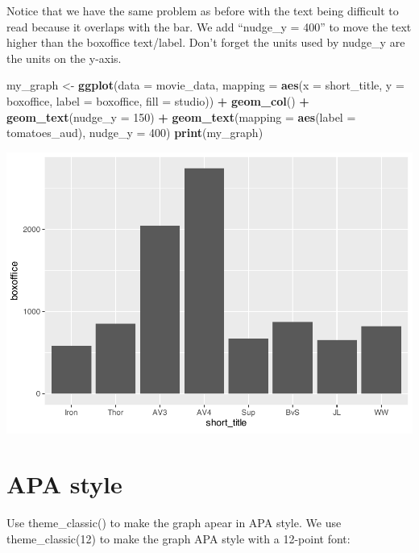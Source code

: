 \documentclass[
]{krantz}
\makeatletter
\newenvironment{Shaded}{\begin{snugshade}}{\end{snugshade}}
\newcommand{\DataTypeTok}[1]{\textcolor[rgb]{0.27,0.27,0.27}{#1}}
\newcommand{\DecValTok}[1]{\textcolor[rgb]{0.06,0.06,0.06}{#1}}
\newcommand{\KeywordTok}[1]{\textcolor[rgb]{0.27,0.27,0.27}{\textbf{#1}}}
\newcommand{\NormalTok}[1]{#1}
\newcommand{\OperatorTok}[1]{\textcolor[rgb]{0.43,0.43,0.43}{\textbf{#1}}}
\newcommand{\StringTok}[1]{\textcolor[rgb]{0.5,0.5,0.5}{#1}}
\newenvironment{kframe}{%
\medskip{}
\setlength{\fboxsep}{.8em}
 \def\at@end@of@kframe{}%
 \ifinner\ifhmode%
  \def\at@end@of@kframe{\end{minipage}}%
  \begin{minipage}{\columnwidth}%
 \fi\fi%
 \def\FrameCommand##1{\hskip\@totalleftmargin \hskip-\fboxsep
 \colorbox{shadecolor}{##1}\hskip-\fboxsep
     \hskip-\linewidth \hskip-\@totalleftmargin \hskip\columnwidth}%
 \MakeFramed {\advance\hsize-\width
   \@totalleftmargin\z@ \linewidth\hsize
   \@setminipage}}%
 {\par\unskip\endMakeFramed%
 \at@end@of@kframe}
\renewenvironment{Shaded}{\begin{kframe}}{\end{kframe}}
\makeatother
\begin{document}
Notice that we have the same problem as before with the text being difficult to read because it overlaps with the bar. We add ``nudge\_y = 400'' to move the text higher than the boxoffice text/label. Don't forget the units used by nudge\_y are the units on the y-axis.

\begin{Shaded}
\begin{Highlighting}[]
\NormalTok{my_graph <-}\StringTok{ }\KeywordTok{ggplot}\NormalTok{(}\DataTypeTok{data =}\NormalTok{ movie_data,}
           \DataTypeTok{mapping =} \KeywordTok{aes}\NormalTok{(}\DataTypeTok{x =}\NormalTok{ short_title,}
                         \DataTypeTok{y =}\NormalTok{ boxoffice,}
                         \DataTypeTok{label =}\NormalTok{ boxoffice, }
                         \DataTypeTok{fill =}\NormalTok{ studio)) }\OperatorTok{+}
\StringTok{  }\KeywordTok{geom_col}\NormalTok{() }\OperatorTok{+}
\StringTok{  }\KeywordTok{geom_text}\NormalTok{(}\DataTypeTok{nudge_y =} \DecValTok{150}\NormalTok{)  }\OperatorTok{+}
\StringTok{  }\KeywordTok{geom_text}\NormalTok{(}\DataTypeTok{mapping =} \KeywordTok{aes}\NormalTok{(}\DataTypeTok{label =}\NormalTok{ tomatoes_aud), }
            \DataTypeTok{nudge_y =} \DecValTok{400}\NormalTok{) }
\KeywordTok{print}\NormalTok{(my_graph)}
\end{Highlighting}
\end{Shaded}

\includegraphics[width=0.65\linewidth]{bookdown_files/figure-latex/unnamed-chunk-114-1}

\newpage

\hypertarget{apa-style}{%
\section{APA style}\label{apa-style}}

Use theme\_classic() to make the graph apear in APA style. We use theme\_classic(12) to make the graph APA style with a 12-point font:
\end{document}
